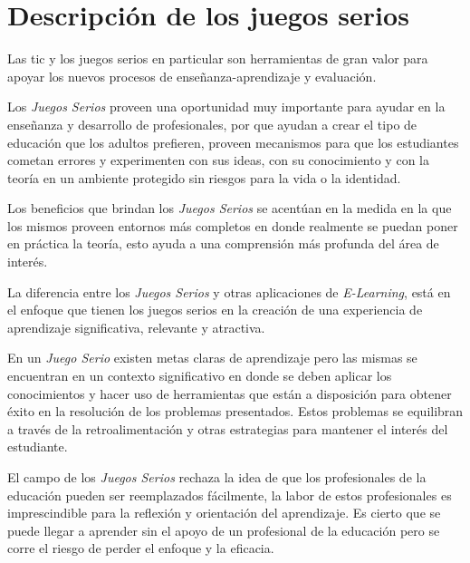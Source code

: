 \section{Descripción de los juegos serios}

Las \Gls{tic} y los juegos serios en particular son herramientas de gran valor
para apoyar los nuevos procesos de enseñanza-aprendizaje y
evaluación\cite{guenaga2013serious}. 


Los \emph{Juegos Serios} proveen una oportunidad muy importante para ayudar en
la enseñanza y desarrollo de profesionales\cite{mariluz:seiousgames}, por que
ayudan a crear el tipo de educación que los adultos prefieren, proveen
mecanismos para que los estudiantes cometan errores y experimenten con sus
ideas, con su conocimiento y con la teoría en un ambiente protegido sin riesgos
para la vida o la identidad\cite{sg:aoverview}. 

Los beneficios que brindan los \emph{Juegos Serios} se acentúan en la medida en
la que los mismos proveen entornos más completos en donde realmente se puedan
poner en práctica la teoría, esto ayuda a una comprensión más profunda del área
de interés\cite{sg:aoverview}.

La diferencia entre los \emph{Juegos Serios} y otras aplicaciones de
\emph{E-Learning}, está en el enfoque que tienen los juegos serios en la creación
de una experiencia de aprendizaje significativa, relevante y
atractiva\cite{sg:aoverview}.

En un \emph{Juego Serio} existen metas claras de aprendizaje pero las mismas se
encuentran en un contexto significativo en donde se deben aplicar los
conocimientos y hacer uso de herramientas que están a disposición para obtener
éxito en la resolución de los problemas presentados. Estos problemas se
equilibran a través de la retroalimentación y otras estrategias para mantener el
interés del estudiante\cite{sg:aoverview}.

El campo de los \emph{Juegos Serios} rechaza la idea de que los profesionales de
la educación pueden ser reemplazados fácilmente, la labor de estos profesionales
es imprescindible para la reflexión y orientación del
aprendizaje\cite{elearning:seiousgames}. Es cierto que se puede llegar a
aprender sin el apoyo de un profesional de la educación pero se corre el riesgo
de perder el enfoque y la eficacia\cite{elearning:seiousgames}. 

